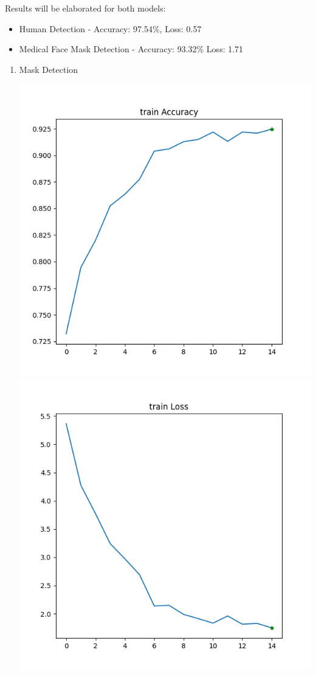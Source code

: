 Results will be elaborated for both models:


\begin{itemize}
    \item Human Detection - Accuracy: 97.54\%, Loss: 0.57
    \item Medical Face Mask Detection - Accuracy: 93.32\% Loss: 1.71
\end{itemize}

\begin{enumerate}
    \item Mask Detection


    \includegraphics[scale=0.5]{images/report/FaceMask-train-accuracy}
    \includegraphics[scale=0.5]{images/report/FaceMask-train-loss}


\end{enumerate}
